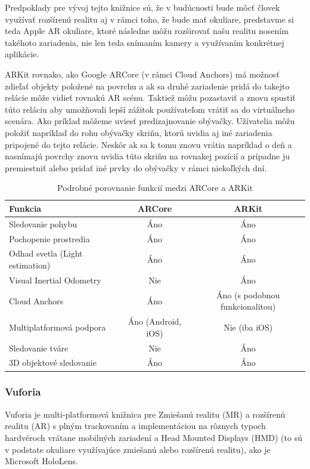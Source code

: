 Predpoklady pre vývoj tejto knižnice sú, že v budúcnosti bude môcť človek využívať rozšírenú realitu aj v rámci toho, že bude mať okuliare, predstavme si teda Apple AR okuliare, ktoré následne môžu rozširovať našu realitu nosením takéhoto zariadenia, nie len teda snímaním kamery a využívaním konkrétnej aplikácie.

ARKit rovnako, ako Google ARCore (v rámci Cloud Anchors) má možnosť zdieľať objekty položené na povrchu a ak sa druhé zariadenie pridá do takejto relácie môže vidieť rovnakú AR scénu. Taktiež môžu pozastaviť a znovu spustiť túto reláciu aby umožňovali lepší zážitok používateľom vrátiť sa do virtuálneho scenára. Ako príklad môžeme uviesť predizajnovanie obývačky. Užívatelia môžu položiť napríklad do rohu obývačky skriňu, ktorú uvidia aj iné zariadenia pripojené do tejto relácie. Neskôr ak sa k tomu znovu vrátia napríklad o deň a nasnímajú povrchy znovu uvidia túto skriňu na rovnakej pozícií a prípadne ju premiestniť alebo pridať iné prvky do obývačky v rámci niekoľkých dní. \cite{picaro2022arkit}

\begin{table}[h]
\centering
\caption{Podrobné porovnanie funkcií medzi ARCore a ARKit}
\label{tab:arcore-arkit-comparison}
\begin{tabular}{|l|c|c|}
\hline
\textbf{Funkcia} & \textbf{ARCore} & \textbf{ARKit} \\ \hline
Sledovanie pohybu & Áno & Áno \\ \hline
Pochopenie prostredia & Áno & Áno \\ \hline
Odhad svetla (Light estimation) & Áno & Áno \\ \hline
Visual Inertial Odometry & Nie & Áno \\ \hline
Cloud Anchors & Áno & Áno (s podobnou funkcionalitou) \\ \hline
Multiplatformová podpora & Áno (Android, iOS) & Nie (iba iOS) \\ \hline
Sledovanie tváre & Nie & Áno \\ \hline
3D objektové sledovanie & Áno & Áno \\ \hline
\end{tabular}
\end{table}

\subsubsection{Vuforia}

Vuforia je multi-platformová knižnica pre Zmiešanú realitu (MR) a rozšírenú realitu (AR) s plným trackovaním a implementáciou na rôznych typoch hardvéroch vrátane mobilných zariadení a Head Mounted Displays (HMD) (to sú v podstate okuliare využívajúce zmiešanú alebo rozšírenú realitu), ako je Microsoft HoloLens.

